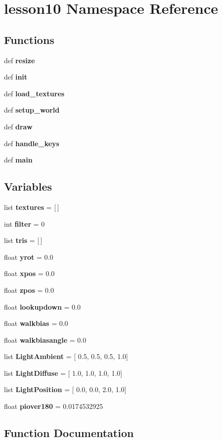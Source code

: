 \section{lesson10 Namespace Reference}
\label{namespacelesson10}


\subsection*{Functions}
\begin{CompactItemize}
\item 
def {\bf resize}
\item 
def {\bf init}
\item 
def {\bf load\_\-textures}
\item 
def {\bf setup\_\-world}
\item 
def {\bf draw}
\item 
def {\bf handle\_\-keys}
\item 
def {\bf main}
\end{CompactItemize}
\subsection*{Variables}
\begin{CompactItemize}
\item 
list {\bf textures} = [$\,$]
\item 
int {\bf filter} = 0
\item 
list {\bf tris} = [$\,$]
\item 
float {\bf yrot} = 0.0
\item 
float {\bf xpos} = 0.0
\item 
float {\bf zpos} = 0.0
\item 
float {\bf lookupdown} = 0.0
\item 
float {\bf walkbias} = 0.0
\item 
float {\bf walkbiasangle} = 0.0
\item 
list {\bf LightAmbient} = [ 0.5, 0.5, 0.5, 1.0]
\item 
list {\bf LightDiffuse} = [ 1.0, 1.0, 1.0, 1.0]
\item 
list {\bf LightPosition} = [ 0.0, 0.0, 2.0, 1.0]
\item 
float {\bf piover180} = 0.0174532925
\end{CompactItemize}


\subsection{Function Documentation}
